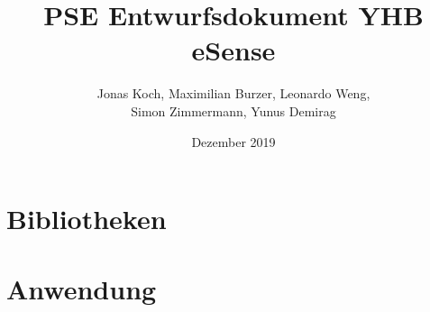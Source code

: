 \documentclass[12pt,a4paper,titlepage,ngerman]{article}
\title{PSE Entwurfsdokument YHB eSense}
\author{Jonas Koch, Maximilian Burzer, Leonardo Weng, \\ Simon Zimmermann, Yunus Demirag}
\date{Dezember 2019}
\begin{document}
	
	\part*{Bibliotheken}
	
	
	\part*{Anwendung}
	
	
	
\end{document}
